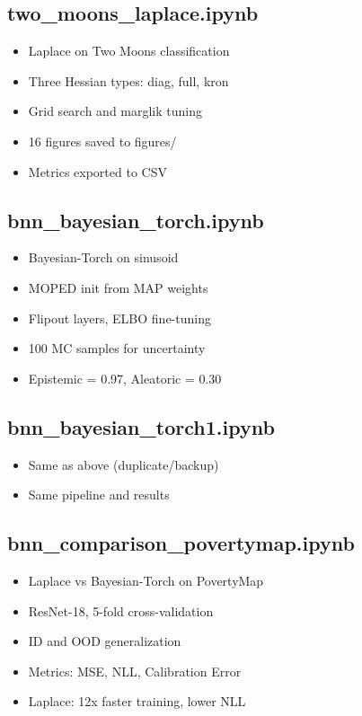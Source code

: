 \documentclass[11pt]{article}
\begin{document}
\subsection{two\_moons\_laplace.ipynb}
\begin{itemize}
\item Laplace on Two Moons classification
\item Three Hessian types: diag, full, kron
\item Grid search and marglik tuning
\item 16 figures saved to figures/
\item Metrics exported to CSV
\end{itemize}

\subsection{bnn\_bayesian\_torch.ipynb}
\begin{itemize}
\item Bayesian-Torch on sinusoid
\item MOPED init from MAP weights
\item Flipout layers, ELBO fine-tuning
\item 100 MC samples for uncertainty
\item Epistemic = 0.97, Aleatoric = 0.30
\end{itemize}

\subsection{bnn\_bayesian\_torch1.ipynb}
\begin{itemize}
\item Same as above (duplicate/backup)
\item Same pipeline and results
\end{itemize}

\subsection{bnn\_comparison\_povertymap.ipynb}
\begin{itemize}
\item Laplace vs Bayesian-Torch on PovertyMap
\item ResNet-18, 5-fold cross-validation
\item ID and OOD generalization
\item Metrics: MSE, NLL, Calibration Error
\item Laplace: 12x faster training, lower NLL
\end{itemize}
\end{document}
